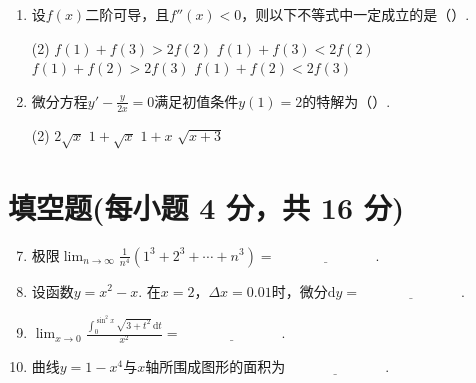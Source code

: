 \documentclass[../Main.tex]{subfiles}
\begin{document}
\begin{enumerate}
    \item 设$f(x)$二阶可导，且$f''(x)<0$，则以下不等式中一定成立的是（\qquad）.

          \begin{tasks}[label=\textbf{\Alph*.}, label-width=1.5em, column-sep=1em](2)
              \task $f(1)+f(3)>2f(2)$
              \task $f(1)+f(3)<2f(2)$
              \task $f(1)+f(2)>2f(3)$
              \task $f(1)+f(2)<2f(3)$
          \end{tasks}
          \vspace{1em}

    \item 微分方程$y'-\frac{y}{2x}=0$满足初值条件$y(1)=2$的特解为（\qquad）.

          \begin{tasks}[label=\textbf{\Alph*.}, label-width=1.5em, column-sep=1em](2)
              \task $2\sqrt{x}$
              \task $1+\sqrt{x}$
              \task $1+x$
              \task $\sqrt{x+3}$
          \end{tasks}
          \vspace{1em}
\end{enumerate}

\section{填空题(每小题 4 分，共 16 分)}
\begin{enumerate}
    \setcounter{enumi}{6}
    \item 极限$\lim_{n\to\infty}\frac{1}{n^{4}}\left(1^{3}+2^{3}+\cdots+n^{3}
              \right)=\underline{\hspace{3cm}}$.
          \vspace{0.5em}

    \item 设函数$y=x^{2}-x$. 在$x=2$，$\Delta x=0.01$时，微分$\mathrm{d}y=\underline
              {\hspace{3cm}}$.
          \vspace{0.5em}

    \item $\lim_{x\to0}\frac{\displaystyle\int_{0}^{\sin^2 x}\sqrt{3+t^2}\,\mathrm{d}t}{x^{2}}
              =\underline{\hspace{3cm}}$.
          \vspace{0.5em}

    \item 曲线$y=1-x^{4}$与$x$轴所围成图形的面积为$\underline{\hspace{3cm}}$.
\end{enumerate}
\end{document}
